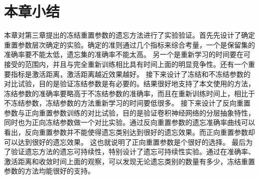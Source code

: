 \section{本章小结}
本章对第三章提出的冻结重置参数的遗忘方法进行了实验验证。首先先设计了确定重置参数层次确定的实验。确定的准则通过几个指标来综合考量，一个是保留集的准确率要不能太低，遗忘集的准确率不能太高。
另一个是重新学习的时间要在可接受的范围内，并且与完全重新训练相比具有时间上面的明显竞争性。还有一个重要指标是激活距离，激活距离越近效果越好。
接下来设计了冻结和不冻结参数的对比试验，目的是验证冻结参数是有必要的。结果很好地支持了本文使用的方法，冻结参数的准确率要略高于不冻结参数的准确率，而且在重新训练时间上，相比于不冻结参数，冻结参数的方法重新学习的时间要低很多。
接下来设计了反向重置参数与正向重置参数训练的对比试验，目的是验证卷积神经网络的分层抽象特性，同时也为正向冻结参数做一个对比实验。通过反向重置参数的遗忘准确率曲线可以看出，反向重置参数并不能使得遗忘类别达到很好的遗忘效果。而正向重置参数却可以达到很好的遗忘效果。
这也就说明了正向重置参数是个很好的选择。
最后为了验证遗忘方法的遗忘可持续性，特别设计了遗忘可持续性实验。通过在准确率、激活距离和收敛时间上面的观察，可以发现无论遗忘类别的数量有多少，冻结重置参数的方法均能很好的支持。

